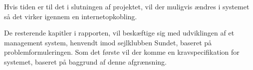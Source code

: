 Hvis tiden er til det i slutningen af projektet, vil der muligvis ændres i systemet så det virker igennem en
internetopkobling.

De resterende kapitler i rapporten, vil beskæftige sig med udviklingen af et management system, henvendt imod
sejlklubben Sundet, baseret på problemformuleringen. Som det første vil der komme en kravspecifikation for
systemet, baseret på baggrund af denne afgrænsning.
